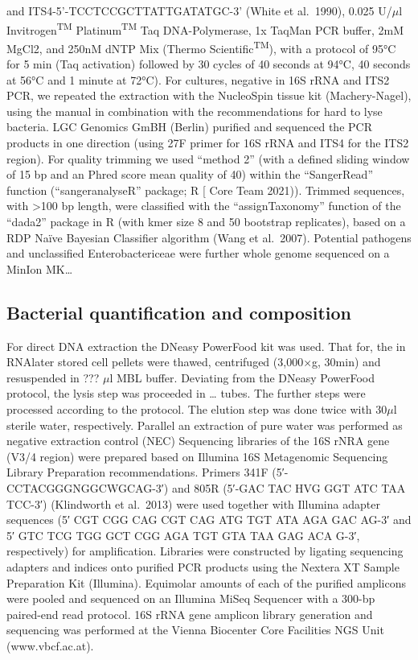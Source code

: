 \documentclass[preprint, 3p,
authoryear]{elsarticle} %
\begin{document}
and ITS4-5'-TCCTCCGCTTATTGATATGC-3' (White et al.~1990), 0.025
U/\(\mu\)l Invitrogen\textsuperscript{TM} Platinum\textsuperscript{TM}
Taq DNA-Polymerase, 1x TaqMan PCR buffer, 2mM MgCl2, and 250nM dNTP Mix
(Thermo Scientific\textsuperscript{TM}), with a protocol of 95°C for 5
min (Taq activation) followed by 30 cycles of 40 seconds at 94°C, 40
seconds at 56°C and 1 minute at 72°C). For cultures, negative in 16S
rRNA and ITS2 PCR, we repeated the extraction with the NucleoSpin tissue
kit (Machery-Nagel), using the manual in combination with the
recommendations for hard to lyse bacteria. LGC Genomics GmBH (Berlin)
purified and sequenced the PCR products in one direction (using 27F
primer for 16S rRNA and ITS4 for the ITS2 region). For quality trimming
we used ``method 2'' (with a defined sliding window of 15 bp and an
Phred score mean quality of 40) within the ``SangerRead'' function
(``sangeranalyseR'' package; R {[}\citet{R} Core Team 2021)). Trimmed
sequences, with \textgreater100 bp length, were classified with the
``assignTaxonomy'' function of the ``dada2'' package in R (with kmer
size 8 and 50 bootstrap replicates), based on a RDP Naïve Bayesian
Classifier algorithm (Wang et al.~2007). Potential pathogens and
unclassified Enterobactericeae were further whole genome sequenced on a
MinIon MK\ldots{}

\hypertarget{bacterial-quantification-and-composition}{%
\subsection{Bacterial quantification and
composition}\label{bacterial-quantification-and-composition}}

For direct DNA extraction the DNeasy PowerFood kit was used. That for,
the in RNAlater stored cell pellets were thawed, centrifuged (3,000×g,
30min) and resuspended in ??? \(\mu\)l MBL buffer. Deviating from the
DNeasy PowerFood protocol, the lysis step was proceeded in \ldots{}
tubes. The further steps were processed according to the protocol. The
elution step was done twice with 30\(\mu\)l sterile water, respectively.
Parallel an extraction of pure water was performed as negative
extraction control (NEC) Sequencing libraries of the 16S rNRA gene (V3/4
region) were prepared based on Illumina 16S Metagenomic Sequencing
Library Preparation recommendations. Primers 341F
(5′-CCTACGGGNGGCWGCAG-3′) and 805R (5′-GAC TAC HVG GGT ATC TAA TCC-3′)
(Klindworth et al.~2013) were used together with Illumina adapter
sequences (5′ CGT CGG CAG CGT CAG ATG TGT ATA AGA GAC AG-3′ and 5′ GTC
TCG TGG GCT CGG AGA TGT GTA TAA GAG ACA G-3′, respectively) for
amplification. Libraries were constructed by ligating sequencing
adapters and indices onto purified PCR products using the Nextera XT
Sample Preparation Kit (Illumina). Equimolar amounts of each of the
purified amplicons were pooled and sequenced on an Illumina MiSeq
Sequencer with a 300-bp paired-end read protocol. 16S rRNA gene amplicon
library generation and sequencing was performed at the Vienna Biocenter
Core Facilities NGS Unit (www.vbcf.ac.at).
\end{document}
